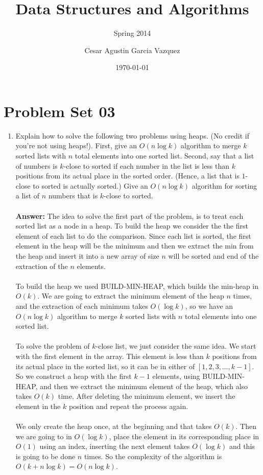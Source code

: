 \documentclass[12pt]{scrartcl}
\title{Data Structures and Algorithms}
\subtitle{Spring 2014}
\author{Cesar Agustin Garcia Vazquez}
\date{\today}                                           %
\begin{document}
\maketitle
\section{Problem Set 03}

\begin{enumerate}
	\item Explain how to solve the following two problems using heaps. (No credit if you're not using heaps!). First, give an $O(n \log k)$ algorithm to merge $k$ sorted lists with $n$ total elements into one sorted list. Second, say that a list of numbers is $k$-close to sorted if each number in the list is less than $k$ positions from its actual place in the sorted order. (Hence, a list that is $1$-close to sorted is actually sorted.) Give an $O(n \log k)$ algorithm for sorting a list  of $n$ numbers that is $k$-close to sorted.\\
	\\
	\textbf{Answer: } The idea to solve the first part of the problem, is to treat each sorted list as a node in a heap. To build the heap we consider the the first element of each list to do the comparison. Since each list is sorted, the first element in the heap will be the minimum and then we extract the min from the heap and insert it into a new array of size $n$ will be sorted and end of the extraction of the $n$ elements. \\
	\\
	To build the heap we used BUILD-MIN-HEAP, which builds the min-heap in $O(k)$. We are going to extract the minimum element of the heap $n$ times, and the extraction of each minimum takes $O(\log k)$, so we have an $O(n \log k)$ algorithm to merge $k$ sorted lists with $n$ total elements into one sorted list.\\
	\\
	To solve the problem of $k$-close list, we just consider the same idea. We start with the first element in the array. This element is less than $k$ positions from its actual place in the sorted list, so it can be in either of $[1, 2, 3, \ldots, k - 1]$. So we construct a heap with the first $k - 1$ elements, using BUILD-MIN-HEAP, and then we extract the minimum element of the heap, which also takes $O(k)$ time. After deleting the minimum element, we insert the element in the $k$ position and repeat the process again.\\
	\\
	We only create the heap once, at the beginning and that takes $O(k)$. Then we are going to  in $O(\log k)$, place the element in its corresponding place in $O(1)$ using an index, inserting the next element takes $O(\log k)$ and this is going to be done $n$ times. So the complexity of the algorithm is $O(k + n \log k) = O(n \log k)$.
		

\end{enumerate}
\end{document}
